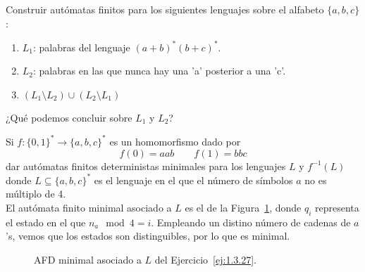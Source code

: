 \begin{ejercicio}\label{ej:1.3.26}
    Construir autómatas finitos para los siguientes lenguajes sobre el alfabeto $\{a,b,c\}$:
    \begin{enumerate}
        \item $L_1$: palabras del lenguaje ${(a+b)}^{\ast}{(b+c)}^{\ast}$.
        \item $L_2$: palabras en las que nunca hay una 'a' posterior a una 'c'.
        \item $(L_1 \setminus L_2)\cup (L_2 \setminus L_1)$
    \end{enumerate}
    ¿Qué podemos concluir sobre $L_1$ y $L_2$?
\end{ejercicio}

\begin{ejercicio}\label{ej:1.3.27}
    Si $f:{\{0,1\}}^{\ast}\rightarrow{\{a,b,c\}}^{\ast}$ es un homomorfismo dado por
    \begin{equation*}
        f(0) = aab \qquad f(1) = bbc
    \end{equation*}
    dar autómatas finitos deterministas minimales para los lenguajes $L$ y $f^{-1}(L)$ donde $L\subseteq {\{a,b,c\}}^{\ast}$ es el lenguaje en el que el número de símbolos $a$ no es múltiplo de 4.\\

    El autómata finito minimal asociado a $L$ es el de la Figura~\ref{fig:1.3.27-L}, donde $q_i$ representa el estado en el que $n_a \mod 4 = i$.
    Empleando un distino número de cadenas de $a$'s, vemos que los estados son distinguibles, por lo que es minimal.
    \begin{figure}[H]
        \centering
        \caption{AFD minimal asociado a $L$ del Ejercicio~\ref{ej:1.3.27}.}
        \label{fig:1.3.27-L}
    \end{figure}


\end{ejercicio}
